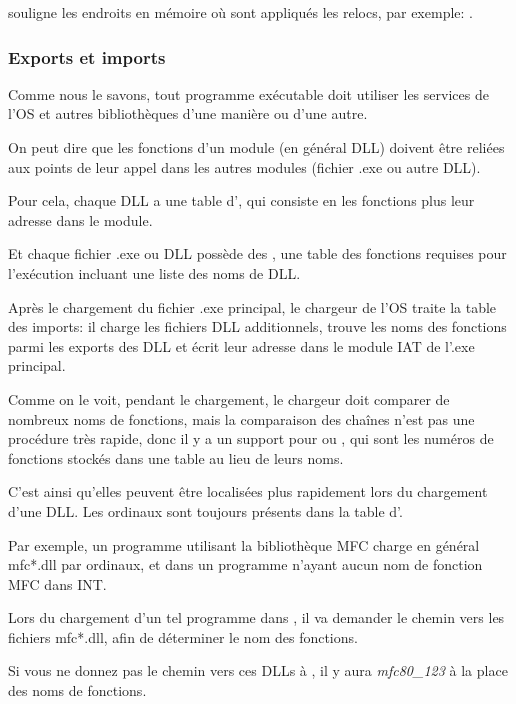\myindex{\olly}
\olly souligne les endroits en mémoire où sont appliqués les relocs, par exemple:
.

\subsubsection{Exports et imports}

\label{PE_exports_imports}
Comme nous le savons, tout programme exécutable doit utiliser les services de l'\ac{OS}
et autres bibliothèques d'une manière ou d'une autre.

On peut dire que les fonctions d'un module (en général DLL) doivent être reliées
aux points de leur appel dans les autres modules (fichier .exe ou autre DLL).

Pour cela, chaque DLL a une table d', qui consiste en les fonctions plus
leur adresse dans le module.

Et chaque fichier .exe ou DLL possède des , une table des fonctions requises
pour l'exécution incluant une liste des noms de DLL.

Après le chargement du fichier .exe principal, le chargeur de l'\ac{OS} traite la
table des imports: il charge les fichiers DLL additionnels, trouve les noms des fonctions
parmi les exports des DLL et écrit leur adresse dans le module \ac{IAT} de l'.exe
principal.


Comme on le voit, pendant le chargement, le chargeur doit comparer de nombreux noms
de fonctions, mais la comparaison des chaînes n'est pas une procédure très rapide,
donc il y a un support pour  ou , qui sont les numéros de fonctions
stockés dans une table au lieu de leurs noms.

C'est ainsi qu'elles peuvent être localisées plus rapidement lors du chargement d'une
DLL. Les ordinaux sont toujours présents dans la table d'.

Par exemple, un programme utilisant la bibliothèque \ac{MFC} charge en général mfc*.dll
par ordinaux, et dans un programme n'ayant aucun nom de fonction \ac{MFC} dans \ac{INT}.

Lors du chargement d'un tel programme dans \IDA, il va demander le chemin vers les
fichiers mfc*.dll, afin de déterminer le nom des fonctions.

Si vous ne donnez pas le chemin vers ces DLLs à \IDA, il y aura \emph{mfc80\_123} à
la place des noms de fonctions.

